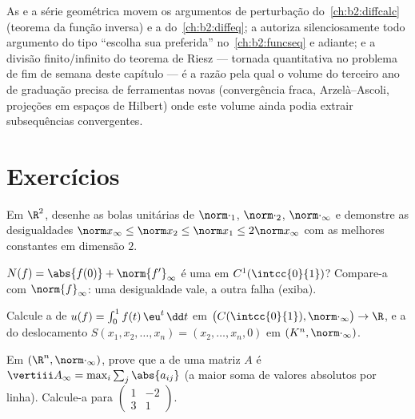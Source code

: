 \begin{remark}
As  e a série geométrica movem os argumentos de perturbação
do~\cref{ch:b2:diffcalc} (teorema da função inversa) e a
 do~\cref{ch:b2:diffeq}; a  autoriza silenciosamente todo argumento do tipo ``escolha sua  preferida''
no~\cref{ch:b2:funcseq} e adiante; e a divisão finito/infinito
do teorema de Riesz --- tornada quantitativa no
problema de fim de semana deste capítulo --- é a razão pela qual o volume do terceiro
ano de graduação precisa de ferramentas novas (convergência fraca, Arzelà--Ascoli,
projeções em espaços de Hilbert) onde este volume ainda podia extrair
subsequências convergentes.
\end{remark}

\section{Exercícios}

\begin{exercise}[$\star$]\label{exo:b2:nvs:1}
Em $\R^2$, desenhe as bolas unitárias de $\norm\cdot_1$, $\norm\cdot_2$,
$\norm\cdot_\infty$ e demonstre as desigualdades $\norm x_\infty
\leq \norm x_2 \leq \norm x_1 \leq 2\norm x_\infty$ com as melhores
constantes em dimensão $2$.
\end{exercise}

\begin{exercise}[$\star$]\label{exo:b2:nvs:2}
$N(f) = \abs{f(0)} + \norm{f'}_\infty$ é uma  em
$C^1(\intcc{0}{1})$? Compare-a com $\norm{f}_\infty$: uma
desigualdade vale, a outra falha (exiba).
\end{exercise}

\begin{exercise}[$\star$]\label{exo:b2:nvs:3}
Calcule a  de $u(f) = \int_0^1 f(t)\,\eu^t\,\dd t$
em $\bigl(C(\intcc{0}{1}), \norm\cdot_\infty\bigr) \to \R$, e a do
deslocamento $S(x_1, x_2, \dots, x_n) = (x_2, \dots, x_n, 0)$ em
$(K^n, \norm\cdot_\infty)$.
\end{exercise}

\begin{exercise}[$\star\star$]\label{exo:b2:nvs:4}
Em $(\R^n, \norm\cdot_\infty)$, prove que a  de uma
matriz $A$ é $\vertiii A_\infty = \max_i \sum_j \abs{a_{ij}}$ (a
maior soma de valores absolutos por linha). Calcule-a para $\begin{pmatrix} 1 & -2\\
3 & 1\end{pmatrix}$.
\end{exercise}

